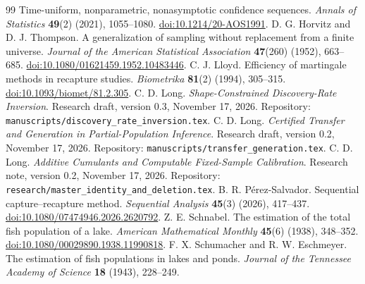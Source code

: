 \documentclass[11pt]{article}
\theoremstyle{remark}\newtheorem{remark}[theorem]{Remark}
\begin{document}
\begin{thebibliography}{99}
Time-uniform, nonparametric, nonasymptotic confidence sequences.
\emph{Annals of Statistics} \textbf{49}(2) (2021), 1055--1080.
\href{https://doi.org/10.1214/20-AOS1991}{doi:10.1214/20-AOS1991}.
 D. G. Horvitz and D. J. Thompson.
A generalization of sampling without replacement from a finite universe.
\emph{Journal of the American Statistical Association} \textbf{47}(260)
(1952), 663--685.
\href{https://doi.org/10.1080/01621459.1952.10483446}{doi:10.1080/01621459.1952.10483446}.
 C. J. Lloyd.
Efficiency of martingale methods in recapture studies.
\emph{Biometrika} \textbf{81}(2) (1994), 305--315.
\href{https://doi.org/10.1093/biomet/81.2.305}{doi:10.1093/biomet/81.2.305}.
 C. D. Long.
\emph{Shape-Constrained Discovery-Rate Inversion}. Research draft, version 0.3,
November 17, 2026. Repository: \texttt{manuscripts/discovery\_rate\_inversion.tex}.
 C. D. Long.
\emph{Certified Transfer and Generation in Partial-Population Inference}.
Research draft, version 0.2, November 17, 2026.
Repository: \texttt{manuscripts/transfer\_generation.tex}.
 C. D. Long.
\emph{Additive Cumulants and Computable Fixed-Sample Calibration}.
Research note, version 0.2, November 17, 2026.
Repository: \texttt{research/master\_identity\_and\_deletion.tex}.
 B. R. P\'erez-Salvador.
Sequential capture--recapture method.
\emph{Sequential Analysis} \textbf{45}(3) (2026), 417--437.
\href{https://doi.org/10.1080/07474946.2026.2620792}{doi:10.1080/07474946.2026.2620792}.
 Z. E. Schnabel.
The estimation of the total fish population of a lake.
\emph{American Mathematical Monthly} \textbf{45}(6) (1938), 348--352.
\href{https://doi.org/10.1080/00029890.1938.11990818}{doi:10.1080/00029890.1938.11990818}.
 F. X. Schumacher and R. W. Eschmeyer.
The estimation of fish populations in lakes and ponds.
\emph{Journal of the Tennessee Academy of Science} \textbf{18} (1943), 228--249.
\end{thebibliography}
\endgroup
\end{document}
